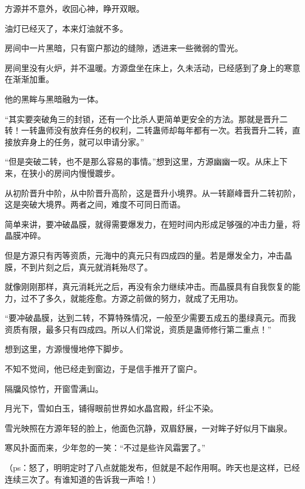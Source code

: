 \begin{this_body}
方源并不意外，收回心神，睁开双眼。

油灯已经灭了，本来灯油就不多。

房间中一片黑暗，只有窗户那边的缝隙，透进来一些微弱的雪光。

房间里没有火炉，并不温暖。方源盘坐在床上，久未活动，已经感到了身上的寒意在渐渐加重。

他的黑眸与黑暗融为一体。

“其实要突破角三的封锁，还有一个比杀人更简单更安全的方法。那就是晋升二转！一转蛊师没有放弃任务的权利，二转蛊师却每年都有一次。若我晋升二转，直接放弃身上的任务，就可以申请分家。”

“但是突破二转，也不是那么容易的事情。”想到这里，方源幽幽一叹。从床上下来，在狭小的房间内慢慢踱步。

从初阶晋升中阶，从中阶晋升高阶，这是晋升小境界。从一转巅峰晋升二转初阶，这是突破大境界。两者之间，难度不可同日而语。

简单来讲，要冲破晶膜，就得需要爆发力，在短时间内形成足够强的冲击力量，将晶膜冲碎。

但是方源只有丙等资质，元海中的真元只有四成四的量。若是爆发全力，冲击晶膜，不到片刻之后，真元就消耗殆尽了。

就像刚刚那样，真元消耗光之后，再没有余力继续冲击。而晶膜具有自我恢复的能力，过不了多久，就能痊愈。方源之前做的努力，就成了无用功。

“要冲破晶膜，达到二转，不算特殊情况，一般至少需要五成五的墨绿真元。而我资质有限，最多只有四成四。所以人们常说，资质是蛊师修行第二重点！”

想到这里，方源慢慢地停下脚步。

不知不觉间，他已经走到窗边，于是信手推开了窗户。

隔牖风惊竹，开窗雪满山。

月光下，雪如白玉，铺得眼前世界如水晶宫殿，纤尘不染。

雪光映照在方源年轻的脸上，他面色沉静，双眉舒展，一对眸子好似月下幽泉。

寒风扑面而来，少年忽的一笑：“不过是些许风霜罢了。”

（ps：怒了，明明定时了八点就能发布，但就是不起作用啊。昨天也是这样，已经连续三次了。有谁知道的告诉我一声哈！）

\end{this_body}

